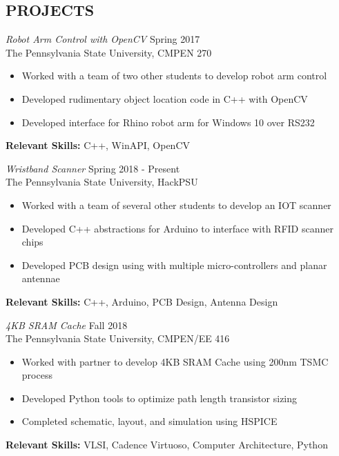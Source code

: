 \documentclass[line,margin]{res}
\begin{document}
\begin{resume}
		\newpage
		\section{PROJECTS}
		{\sl Robot Arm Control with OpenCV} \hfill Spring 2017\\
		The Pennsylvania State University, CMPEN 270
		\begin{itemize}  \itemsep -2pt
			\item Worked with a team of two other students to develop robot arm control
			\item Developed rudimentary object location code in C++ with OpenCV
			\item Developed interface for Rhino robot arm for Windows 10 over RS232 
			\vspace*{-\baselineskip}		
		\end{itemize}
		\textbf{Relevant Skills:} C++, WinAPI, OpenCV
		\newline
		
		{\sl Wristband Scanner} \hfill Spring 2018 - Present\\
		The Pennsylvania State University, HackPSU
		\begin{itemize}  \itemsep -2pt
			\item Worked with a team of several other students to develop an IOT scanner
			\item Developed C++ abstractions for Arduino to interface with RFID scanner chips
			\item Developed PCB design using with multiple micro-controllers and planar antennae
			\vspace*{-\baselineskip}		
		\end{itemize}
		\textbf{Relevant Skills:} C++, Arduino, PCB Design, Antenna Design
		
		{\sl 4KB SRAM Cache} \hfill Fall 2018\\
		The Pennsylvania State University, CMPEN/EE 416
		\begin{itemize}  \itemsep -2pt
			\item Worked with partner to develop 4KB SRAM Cache using 200nm TSMC process
			\item Developed Python tools to optimize path length transistor sizing
			\item Completed schematic, layout, and simulation using HSPICE
			\vspace*{-\baselineskip}		
		\end{itemize}
		\textbf{Relevant Skills:} VLSI, Cadence Virtuoso, Computer Architecture, Python
		

\end{resume}
\end{document}
